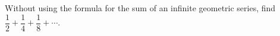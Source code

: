 Without using the formula for the sum of an infinite geometric series, find $\dfrac12+\dfrac14+\dfrac18+\cdots$.
